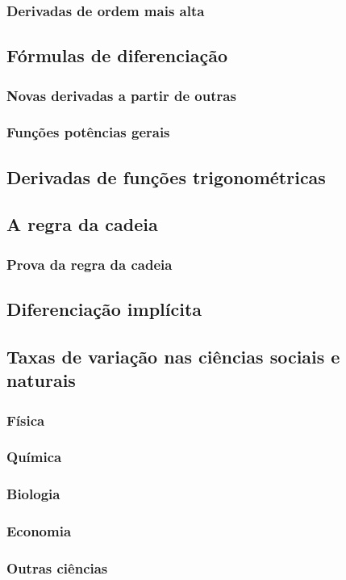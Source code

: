 \subsubsection{Derivadas de ordem mais alta}
\subsection{Fórmulas de diferenciação}
\subsubsection{Novas derivadas a partir de outras}
\subsubsection{Funções potências gerais}
\subsection{Derivadas de funções trigonométricas}
\subsection{A regra da cadeia}
\subsubsection{Prova da regra da cadeia}
\subsection{Diferenciação implícita}
\subsection{Taxas de variação nas ciências sociais e naturais}
\subsubsection{Física}
\subsubsection{Química}
\subsubsection{Biologia}
\subsubsection{Economia}
\subsubsection{Outras ciências}
